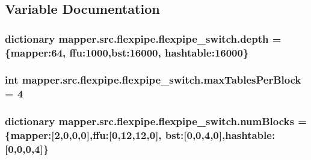 \subsection{Variable Documentation}
\hypertarget{namespacemapper_1_1src_1_1flexpipe_1_1flexpipe__switch_af2b4b608a1330bbc1e76ada76bccb120}{}
\subsubsection[{depth}]{\setlength{\rightskip}{0pt plus 5cm}dictionary mapper.\+src.\+flexpipe.\+flexpipe\+\_\+switch.\+depth = \{\textquotesingle{}mapper\textquotesingle{}\+:64, \textquotesingle{}ffu\textquotesingle{}\+:1000,\textquotesingle{}bst\textquotesingle{}\+:16000, \textquotesingle{}hashtable\textquotesingle{}\+:16000\}}\label{namespacemapper_1_1src_1_1flexpipe_1_1flexpipe__switch_af2b4b608a1330bbc1e76ada76bccb120}
\hypertarget{namespacemapper_1_1src_1_1flexpipe_1_1flexpipe__switch_afb3a1e89a3f957afea5d60fb9341b071}{}
\subsubsection[{max\+Tables\+Per\+Block}]{\setlength{\rightskip}{0pt plus 5cm}int mapper.\+src.\+flexpipe.\+flexpipe\+\_\+switch.\+max\+Tables\+Per\+Block = 4}\label{namespacemapper_1_1src_1_1flexpipe_1_1flexpipe__switch_afb3a1e89a3f957afea5d60fb9341b071}
\hypertarget{namespacemapper_1_1src_1_1flexpipe_1_1flexpipe__switch_a06dd0e0cc250f21126ad65e3d415e620}{}
\subsubsection[{num\+Blocks}]{\setlength{\rightskip}{0pt plus 5cm}dictionary mapper.\+src.\+flexpipe.\+flexpipe\+\_\+switch.\+num\+Blocks = \{\textquotesingle{}mapper\textquotesingle{}\+:\mbox{[}2,0,0,0\mbox{]},\textquotesingle{}ffu\textquotesingle{}\+:\mbox{[}0,12,12,0\mbox{]}, \textquotesingle{}bst\textquotesingle{}\+:\mbox{[}0,0,4,0\mbox{]},\textquotesingle{}hashtable\textquotesingle{}\+:\mbox{[}0,0,0,4\mbox{]}\}}\label{namespacemapper_1_1src_1_1flexpipe_1_1flexpipe__switch_a06dd0e0cc250f21126ad65e3d415e620}
\hypertarget{namespacemapper_1_1src_1_1flexpipe_1_1flexpipe__switch_abee9e96be5924f0094a7173aac274d89}{}
